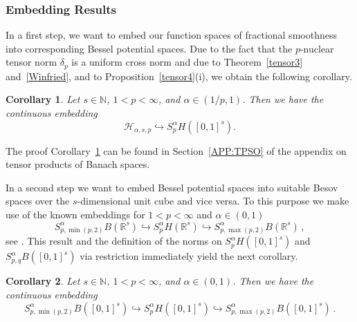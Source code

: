 \documentclass[12pt]{article}
\newtheorem{corollary}{Corollary}
\newcommand{\real}{\mathbb{R}}
\newcommand{\HH}{\mathcal{H}}
\newcommand{\N}{\mathbb{N}}
\newcommand{\be}{\begin{equation}}
\newcommand{\ee}{\end{equation}}
\newcommand{\red}[1]{\textcolor{red}{#1}}
\begin{document}
\subsubsection{Embedding Results} %



In a first step, we want to embed our function spaces of fractional smoothness into corresponding
Bessel potential spaces.
Due to the fact that the $p$-nuclear tensor norm $\delta_p$ is a uniform cross norm and due to
Theorem~\ref{tensor3} and~\ref{Winfried}, and %
to Proposition~\ref{tensor4}(i),
we obtain the following corollary.

\begin{corollary}\label{Winfried2}
Let $s\in \N$,  
$1 <  p < \infty$, and $\alpha\in (1/p,1)$.
Then we have the continuous embedding
\begin{equation*}
\HH_{\alpha,s,p} \hookrightarrow S^\alpha_{p}H([0,1]^s).
\end{equation*}
\end{corollary}

The proof Corollary~\ref{Winfried2} can be found in Section~\ref{APP:TPSO} of the appendix on tensor products of 
Banach spaces.

In a second step we want to embed Bessel potential spaces into suitable Besov spaces over
the $s$-dimensional unit cube and vice versa.
To this purpose we make use of the known embeddings for $1<p <\infty$ and $\alpha\in (0,1)$
\be\label{elementaryembedding}
S^\alpha_{p,\min(p,2)}B(\real^s) \hookrightarrow S^\alpha_{p}H(\real^s)\hookrightarrow 
S^\alpha_{p,\max(p,2)}B(\real^s)\, , 
\ee
see \cite[Prop.~2.2.3/2(iii)]{ST}. 
This result and the definition of the norms on $S^\alpha_{p}H([0,1]^s)$ and $S^\alpha_{p,q}B([0,1]^s)$
via restriction immediately yield the next corollary.

\begin{corollary}\label{Cor:Neu_Equation_60+}
Let $s\in \N$,  
$1 < p < \infty$, and $\alpha\in (0,1)$. %
Then we have the continuous embedding
\begin{equation*}
S^\alpha_{p,\min(p,2)}B([0,1]^s) \hookrightarrow S^\alpha_{p}H([0,1]^s)\hookrightarrow 
S^\alpha_{p,\max(p,2)}B([0,1]^s)\,.
\end{equation*}
\end{corollary}
\end{document}
